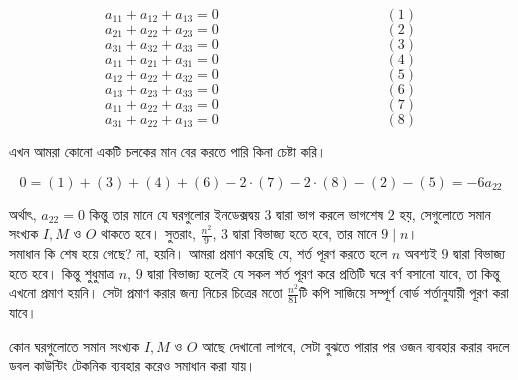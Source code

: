 \documentclass[11pt]{report}
\begin{document}
$$ a_{11} + a_{12} + a_{13} = 0 \hspace{5cm}(1)$$
$$ a_{21} + a_{22} + a_{23} = 0 \hspace{5cm}(2)$$
$$ a_{31} + a_{32} + a_{33} = 0 \hspace{5cm}(3)$$
$$ a_{11} + a_{21} + a_{31} = 0 \hspace{5cm}(4)$$
$$ a_{12} + a_{22} + a_{32} = 0 \hspace{5cm}(5)$$
$$ a_{13} + a_{23} + a_{33} = 0 \hspace{5cm}(6)$$
$$ a_{11} + a_{22} + a_{33} = 0 \hspace{5cm}(7)$$
$$ a_{31} + a_{22} + a_{13} = 0 \hspace{5cm}(8)$$

এখন আমরা কোনো একটি চলকের মান বের করতে পারি কিনা চেষ্টা করি।

$$0 = (1) + (3) + (4) + (6) - 2 \cdot (7) - 2 \cdot (8) - (2) - (5) = -6a_{22}$$

অর্থাৎ, $a_{22} = 0$ কিন্তু তার মানে যে ঘরগুলোর ইনডেক্সদ্বয়  $3$ দ্বারা ভাগ করলে ভাগশেষ $2$ হয়, সেগুলোতে সমান সংখ্যক $I, M$ ও $O$ থাকতে হবে। সুতরাং, $\frac{n^2}{9}$, $3$ দ্বারা বিভাজ্য হতে হবে, তার মানে $9 \mid n$।\\

সমাধান কি শেষ হয়ে গেছে? না, হয়নি। আমরা প্রমাণ করেছি যে, শর্ত পূরণ করতে হলে $n$ অবশ্যই $9$ দ্বারা বিভাজ্য হতে হবে। কিন্তু শুধুমাত্র $n$, $9$ দ্বারা বিভাজ্য হলেই যে সকল শর্ত পূরণ করে প্রতিটি ঘরে বর্ণ বসানো যাবে, তা কিন্তু এখনো প্রমাণ হয়নি। সেটা প্রমাণ করার জন্য নিচের চিত্রের মতো $\frac{n^2}{81}$টি কপি সাজিয়ে সম্পূর্ণ বোর্ড শর্তানুযায়ী পূরণ করা যাবে।

\begin{center}
\end{center}

কোন ঘরগুলোতে সমান সংখ্যক $I, M$ ও $O$ আছে দেখানো লাগবে, সেটা বুঝতে পারার পর ওজন ব্যবহার করার বদলে ডবল কাউন্টিং টেকনিক ব্যবহার করেও সমাধান করা যায়।
\end{document}
